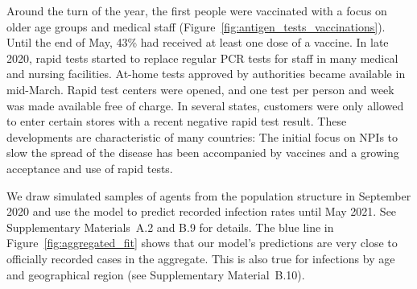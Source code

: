 \documentclass[12pt]{article}
\begin{document}
\begin{figure}[!tp]
\end{figure}

Around the turn of the year, the first people were vaccinated with a focus on older age
groups and medical staff (Figure~\ref{fig:antigen_tests_vaccinations}). Until the end of
May, 43\% had received at least one dose of a vaccine. In late 2020, rapid tests started
to replace regular PCR tests for staff in many medical and nursing facilities. At-home
tests approved by authorities became available in mid-March. Rapid test centers were
opened, and one test per person and week was made available free of charge. In several
states, customers were only allowed to enter certain stores with a recent negative rapid
test result. These developments are characteristic of many countries: The initial focus
on NPIs to slow the spread of the disease has been accompanied by vaccines and a growing
acceptance and use of rapid tests.

We draw simulated samples of agents from the population structure in September 2020 and
use the model to predict recorded infection rates until May 2021. See Supplementary
Materials~A.2 and B.9 for details. The blue line in Figure~\ref{fig:aggregated_fit}
shows that our model's predictions are very close to officially recorded cases in the
aggregate. This is also true for infections by age and geographical region (see
Supplementary Material~B.10).
\end{document}
